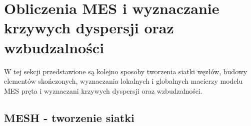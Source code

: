 \section{Obliczenia MES i wyznaczanie krzywych dyspersji oraz wzbudzalności}
\label{cha:obliczenia_mes}

W tej sekcji przedstawione są kolejno sposoby tworzenia siatki węzłów, budowy elementów skończonych, wyznaczania lokalnych i globalnych macierzy modelu MES pręta i wyznaczani krzywych dyspersji oraz wzbudzalności.



\subsection{MESH - tworzenie siatki}
\label{cha:mesh}